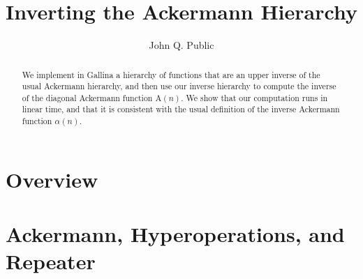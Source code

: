 \documentclass[a4paper,USenglish,cleveref, autoref]{lipics-v2019}
\title{Inverting the Ackermann Hierarchy}
\author{John Q. Public}{Dummy University Computing Laboratory, Country}{}{}{}%
\newcommand{\Ack}{\ensuremath{\text{A}}}
\theoremstyle{plain}
\theoremstyle{definition}
\begin{document}
\maketitle







\begin{abstract}
We implement in Gallina a hierarchy of functions that are an upper inverse
of the {\color{magenta}usual Ackermann hierarchy}, and then use our inverse
hierarchy to compute the inverse of the diagonal Ackermann
function $\Ack(n)$. We show that our computation runs in linear time,
and that it is consistent with the usual definition
of the inverse Ackermann function $\alpha(n)$.
\end{abstract}



\section{Overview}
\label{sec: overview}


\section{Ackermann, Hyperoperations, and Repeater}
\label{sec: countdown-repeater}

\end{document}
